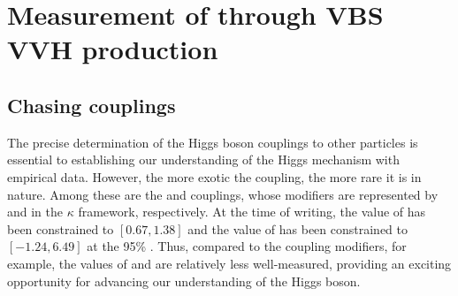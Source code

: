 \chapter{Measurement of \kVV through VBS VVH production}\label{ch:vbsvvh}

\section{Chasing couplings}
The precise determination of the Higgs boson couplings to other particles is essential to establishing our understanding of the Higgs mechanism with empirical data. 
However, the more exotic the coupling, the more rare it is in nature. 
Among these are the \HHVV and \HHH couplings, whose modifiers are represented by \kVV and \kHHH in the $\kappa$ framework, respectively. 
At the time of writing, the value of \kVV has been constrained to $[0.67, 1.38]$ and the value of \kHHH has been constrained to $[-1.24, 6.49]$ at the 95\% \CL. 
Thus, compared to the \kV coupling modifiers, for example, the values of \kVV and \kHHH are relatively less well-measured, providing an exciting opportunity for advancing our understanding of the Higgs boson. 

